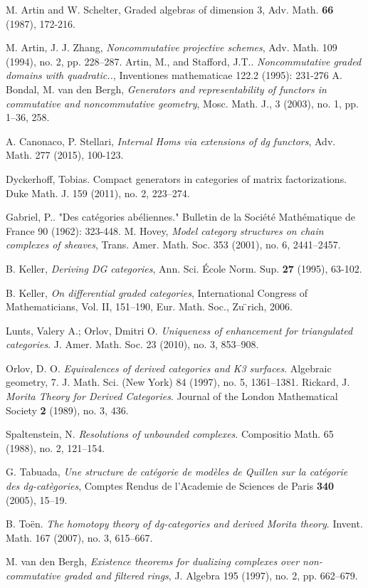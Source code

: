 \documentclass[reqno, 12pt]{amsart}
\begin{document}
\begin{thebibliography}{99}
 M. Artin and W. Schelter, Graded algebras of dimension 3, Adv. Math. \textbf{66} (1987), 172-216.
  
  M. Artin, J. J. Zhang, \emph{Noncommutative projective schemes}, Adv. Math. 109 (1994), no. 2, pp. 228--287.
  Artin, M., and Stafford, J.T.. \emph{Noncommutative graded domains with quadratic..}, Inventiones mathematicae 122.2 (1995): 231-276
  A. Bondal, M. van den Bergh, \emph{Generators and representability of functors in commutative and noncommutative geometry}, Mosc. Math. J., 3 (2003), no. 1, pp. 1--36, 258.
  
  A. Canonaco, P. Stellari, \emph{Internal Homs via extensions of dg functors}, Adv. Math. 277 (2015), 100-123.

  Dyckerhoff, Tobias. Compact generators in categories of matrix factorizations. Duke Math. J. 159 (2011), no. 2, 223--274.

  Gabriel, P.. "Des catégories abéliennes." Bulletin de la Société Mathématique de France 90 (1962): 323-448.
  M. Hovey, \emph{Model category structures on chain complexes of sheaves}, Trans. Amer. Math. Soc. 353 (2001), no. 6, 2441--2457.

  B. Keller, \emph{Deriving DG categories}, Ann. Sci. \'{E}cole Norm. Sup. \textbf{27} (1995), 63-102.

  B. Keller, \emph{On differential graded categories}, International Congress of Mathematicians, Vol. II, 151–190, Eur. Math. Soc., Zu ̈rich, 2006.
  
  Lunts, Valery A.; Orlov, Dmitri O. {\em Uniqueness of enhancement for triangulated categories}. J. Amer. Math. Soc. 23 (2010), no. 3, 853--908.

  Orlov, D. O. {\em Equivalences of derived categories and K3 surfaces}. Algebraic geometry, 7. J.
  Math. Sci. (New York) 84 (1997), no. 5, 1361–1381.
  Rickard, J. {\em Morita Theory for Derived Categories}. Journal of the London Mathematical Society \textbf{2} (1989), no. 3, 436.

  Spaltenstein, N. {\em Resolutions of unbounded complexes}. Compositio Math. 65 (1988), no. 2, 121--154.

  G. Tabuada, \emph{Une structure de cat\'{e}gorie de mod\`{e}les de Quillen sur la cat\'{e}gorie des dg-cat\`{e}gories}, Comptes Rendus de l'Academie de Sciences de Paris \textbf{340} (2005), 15--19.
  
  B. To\"en. \emph{The homotopy theory of dg-categories and derived Morita theory}. Invent. Math. 167 (2007), no. 3, 615--667. 
  
  M. van den Bergh, \emph{Existence theorems for dualizing complexes over non-commutative graded and filtered rings}, J. Algebra 195 (1997), no. 2, pp. 662--679.

\end{thebibliography}
\end{document}
